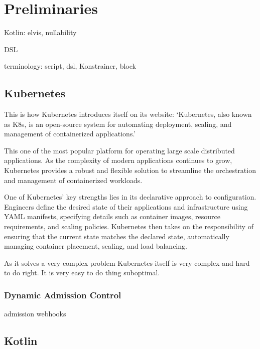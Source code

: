 \setlength{\parindent}{0pt}
\setlength{\parskip}{0.6em}

\chapter{Preliminaries}
\label{chap:prerequisites}

Kotlin: elvis, nullability

DSL

terminology: script, dsl, Konstrainer, block

\section{Kubernetes}

This is how Kubernetes introduces itself on its website\cite{K8s}: `Kubernetes, also known as K8s, is an open-source system for automating deployment, scaling, and management of containerized applications.'

This one of the most popular platform for operating large scale distributed applications. As the complexity of modern applications continues to grow, Kubernetes provides a robust and flexible solution to streamline the orchestration and management of containerized workloads.

One of Kubernetes' key strengths lies in its declarative approach to configuration. Engineers define the desired state of their applications and infrastructure using YAML manifests, specifying details such as container images, resource requirements, and scaling policies. Kubernetes then takes on the responsibility of ensuring that the current state matches the declared state, automatically managing container placement, scaling, and load balancing.

As it solves a very complex problem Kubernetes itself is very complex and hard to do right. It is very easy to do thing suboptimal. 

\subsection{Dynamic Admission Control}

admission webhooks

\section{Kotlin}

